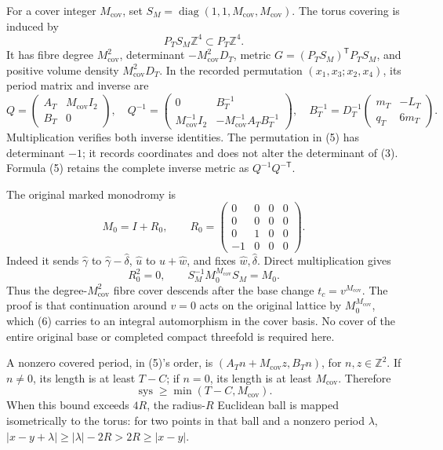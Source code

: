 \documentclass[
  11pt,
]{article}
\begin{document}
For a cover integer \(M_{\mathrm{cov}}\), set
\(S_M=\operatorname{diag}(1,1,M_{\mathrm{cov}},M_{\mathrm{cov}})\). The
torus covering is induced by \[
 P_TS_M\mathbb Z^4\subset P_T\mathbb Z^4.
\] It has fibre degree \(M_{\mathrm{cov}}^2\), determinant
\(-M_{\mathrm{cov}}^2D_T\), metric \(G=(P_TS_M)^{\mathsf T}P_TS_M\), and
positive volume density \(M_{\mathrm{cov}}^2D_T\). In the recorded
permutation \((x_1,x_3;x_2,x_4)\), its period matrix and inverse are \[
 Q=\begin{pmatrix}A_T&M_{\mathrm{cov}}I_2\\B_T&0\end{pmatrix},
 \quad Q^{-1}=\begin{pmatrix}0&B_T^{-1}\\
 M_{\mathrm{cov}}^{-1}I_2&-M_{\mathrm{cov}}^{-1}A_TB_T^{-1}\end{pmatrix},
 \quad B_T^{-1}=D_T^{-1}\begin{pmatrix}m_T&-L_T\\q_T&6m_T\end{pmatrix}.
\tag{5}
\] Multiplication verifies both inverse identities. The permutation in
(5) has determinant \(-1\); it records coordinates and does not alter
the determinant of (3). Formula (5) retains the complete inverse metric
as \(Q^{-1}Q^{-\mathsf T}\).

The original marked monodromy is \[
 M_0=I+R_0,\qquad
 R_0=\begin{pmatrix}0&0&0&0\\0&0&0&0\\0&1&0&0\\-1&0&0&0\end{pmatrix}.
\] Indeed it sends \(\widehat\gamma\) to
\(\widehat\gamma-\widehat\delta\), \(\widehat u\) to
\(\widehat u+\widehat w\), and fixes \(\widehat w,\widehat\delta\).
Direct multiplication gives \[
 R_0^2=0,\qquad S_M^{-1}M_0^{M_{\mathrm{cov}}}S_M=M_0.
\tag{6}
\] Thus the degree-\(M_{\mathrm{cov}}^2\) fibre cover descends after the
base change \(t_c=v^{M_{\mathrm{cov}}}\). The proof is that continuation
around \(v=0\) acts on the original lattice by
\(M_0^{M_{\mathrm{cov}}}\), which (6) carries to an integral
automorphism in the cover basis. No cover of the entire original base or
completed compact threefold is required here.

A nonzero covered period, in (5)'s order, is
\((A_Tn+M_{\mathrm{cov}}z,B_Tn)\), for \(n,z\in\mathbb Z^2\). If
\(n\ne0\), its length is at least \(T-C\); if \(n=0\), its length is at
least \(M_{\mathrm{cov}}\). Therefore \[
 \operatorname{sys}\ge\min(T-C,M_{\mathrm{cov}}).
\tag{7}
\] When this bound exceeds \(4R\), the radius-\(R\) Euclidean ball is
mapped isometrically to the torus: for two points in that ball and a
nonzero period \(\lambda\), \(|x-y+\lambda|\ge|\lambda|-2R>2R\ge|x-y|\).
\end{document}
